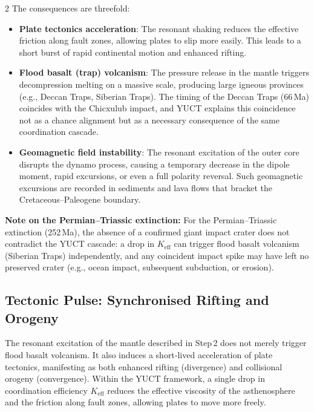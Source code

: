\documentclass[11pt,a4paper]{article}
\begin{document}
\begin{multicols}{2}
		The consequences are threefold:
		\begin{itemize}
			\item \textbf{Plate tectonics acceleration}: The resonant shaking 
			reduces the effective friction along fault zones, allowing plates to 
			slip more easily. This leads to a short burst of rapid continental 
			motion and enhanced rifting.
			\item \textbf{Flood basalt (trap) volcanism}: The pressure release 
			in the mantle triggers decompression melting on a massive scale, 
			producing large igneous provinces (e.g., Deccan Traps, Siberian Traps). 
			The timing of the Deccan Traps (66 Ma) coincides with the Chicxulub 
			impact, and YUCT explains this coincidence not as a chance alignment 
			but as a necessary consequence of the same coordination cascade.
			\item \textbf{Geomagnetic field instability}: The resonant excitation 
			of the outer core disrupts the dynamo process, causing a temporary 
			decrease in the dipole moment, rapid excursions, or even a full 
			polarity reversal. Such geomagnetic excursions are recorded in 
			sediments and lava flows that bracket the Cretaceous–Paleogene 
			boundary.
		\end{itemize}
		
		\noindent
		\textbf{Note on the Permian–Triassic extinction:} 
		For the Permian–Triassic extinction (252 Ma), the absence of a confirmed 
		giant impact crater does not contradict the YUCT cascade: a drop in 
		\(K_{\mathrm{eff}}\) can trigger flood basalt volcanism (Siberian Traps) 
		independently, and any coincident impact spike may have left no preserved 
		crater (e.g., ocean impact, subsequent subduction, or erosion).
		
		\subsection{Tectonic Pulse: Synchronised Rifting and Orogeny}
		
		The resonant excitation of the mantle described in Step 2 does not merely trigger flood basalt volcanism.  
		It also induces a short‑lived acceleration of plate tectonics, manifesting as both enhanced rifting 
		(divergence) and collisional orogeny (convergence).  Within the YUCT framework, a single drop in 
		coordination efficiency \(K_{\mathrm{eff}}\) reduces the effective viscosity of the asthenosphere and 
		the friction along fault zones, allowing plates to move more freely.
		

\end{multicols}
\end{document}
